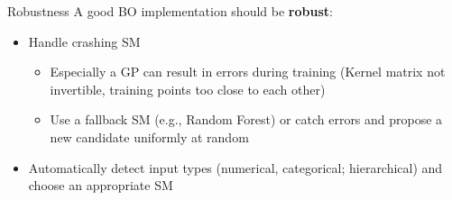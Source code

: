 \documentclass[11pt,compress,t,notes=noshow, xcolor=table]{beamer}
\begin{document}
\begin{frame}{Robustness}
A good BO implementation should be \textbf{robust}:\\
\vspace{1em}
\begin{itemize}
  \item Handle crashing SM
  \begin{itemize}
    \item Especially a GP can result in errors during training (Kernel matrix not invertible, training points too close to each other)
    \item Use a fallback SM (e.g., Random Forest) or catch errors and propose a new candidate uniformly at random
  \end{itemize}
  \item Automatically detect input types (numerical, categorical; hierarchical) and choose an appropriate SM
\end{itemize}
\end{frame}

\endlecture
\end{document}
